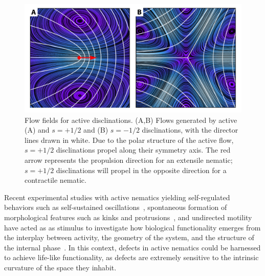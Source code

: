 \begin{figure}
  \centering
  \includegraphics{figures/C3/Ch3-Figs_DefectFlow.png}
  \caption{Flow fields for active disclinations.
  (A,B) Flows generated by active (A) and $s=+1/2$ and (B) $s=-1/2$ disclinations, with the director lines drawn in white.
  Due to the polar structure of the active flow, $s = +1/2$ disclinations propel along their symmetry axis.
  The red arrow represents the propulsion direction for an extensile nematic; $s = +1/2$ disclinations will propel in the opposite direction for a contractile nematic.}\label{f:3-DefectFlow}
\end{figure}

Recent experimental studies with active nematics yielding self-regulated behaviors such as self-sustained oscillations~\cite{RN9}, spontaneous formation of morphological features such as kinks and protrusions~\cite{RN9,RN3}, and undirected motility~\cite{RN9,RN3} have acted as as stimulus to investigate how biological functionality emerges from the interplay between activity, the geometry of the system, and the structure of the internal phase~\cite{RN160,RN51,RN10}.
In this context, defects in active nematics could be harnessed to achieve life-like functionality, as defects are extremely sensitive to the intrinsic curvature of the space they inhabit.

